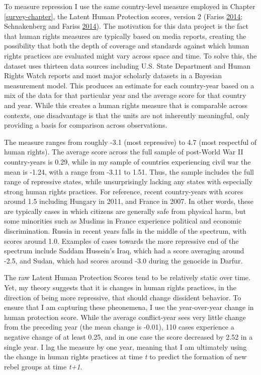 \documentclass[12pt,]{book}
\theoremstyle{definition}
\theoremstyle{definition}
\theoremstyle{remark}
\begin{document}
To measure repression I use the same country-level measure employed in
Chapter \ref{survey-chapter}, the Latent Human Protection scores,
version 2 (Fariss \protect\hyperlink{ref-Fariss2014}{2014}; Schnakenberg
and Fariss \protect\hyperlink{ref-Schnakenberg2014}{2014}). The
motivation for this data project is the fact that human rights measures
are typically based on media reports, creating the possibility that both
the depth of coverage and standards against which human rights practices
are evaluated might vary across space and time. To solve this, the
dataset uses thirteen data sources including U.S. State Department and
Human Rights Watch reports and most major scholarly datasets in a
Bayesian measurement model. This produces an estimate for each
country-year based on a mix of the data for that particular year and the
average score for that country and year. While this creates a human
rights measure that is comparable across contexts, one disadvantage is
that the units are not inherently meaningful, only providing a basis for
comparison across observations.

The measure ranges from roughly -3.1 (most repressive) to 4.7 (most
respectful of human rights). The average score across the full sample of
post-World War II country-years is 0.29, while in my sample of countries
experiencing civil war the mean is -1.24, with a range from -3.11 to
1.51. Thus, the sample includes the full range of repressive states,
while unsurprisingly lacking any states with especially strong human
rights practices. For reference, recent country-years with scores around
1.5 including Hungary in 2011, and France in 2007. In other words, these
are typically cases in which citizens are generally safe from physical
harm, but some minorities such as Muslims in France experience political
and economic discrimination. Russia in recent years falls in the middle
of the spectrum, with scores around 1.0. Examples of cases towards the
more repressive end of the spectrum include Saddam Hussein's Iraq, which
had a score averaging around -2.5, and Sudan, which had scores around
-3.0 during the genocide in Darfur.

The raw Latent Human Protection Scores tend to be relatively static over
time. Yet, my theory suggests that it is changes in human rights
practices, in the direction of being more repressive, that should change
dissident behavior. To ensure that I am capturing these pheonemena, I
use the year-over-year change in human protection score. While the
average conflict-year sees very little change from the preceding year
(the mean change is -0.01), 110 cases experience a negative change of at
least 0.25, and in one case the score decreased by 2.52 in a single
year. I lag the measure by one year, meaning that I am ultimately using
the change in human rights practices at time \emph{t} to predict the
formation of new rebel groups at time \emph{t+1}.
\end{document}
